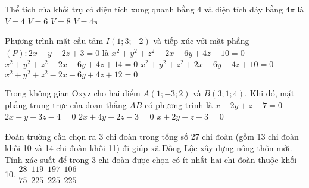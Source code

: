 \begin{ex}%
	Thể tích của khối trụ có điện tích xung quanh bằng 4 và diện tích đáy bằng $4\pi$ là
	\choice
	{\True $V=4$}
	{$V=6$}
	{$V=8$}
	{$V=4\pi$}
\end{ex}
\begin{ex}%
	Phương trình mặt cầu tâm $I\left(1;3;-2\right)$ và tiếp xúc với mặt phẳng $(P): 2x-y-2z+3=0$ là
	\choice
	{\True $x^2+y^2+z^2-2x-6y+4z+10=0$}
	{$x^2+y^2+z^2-2x-6y+4z+14=0$}
	{$x^2+y^2+z^2+2x+6y-4z+10=0$}
	{$x^2+y^2+z^2-2x-6y+4z+12=0$}
\end{ex}
\begin{ex}%
	Trong không gian Oxyz cho hai điểm $A(1;-3;2)$ và $B(3;1;4)$. Khi đó, mặt phẳng trung trực của đoạn thẳng $AB$ có phương trình là
	\choice
	{$x-2y+z-7=0$}
	{$2x-y+3z-4=0$}
	{$2x+4y+2z-3=0$}
	{\True $x+2y+z-3=0$}
\end{ex}
\begin{ex}%
	Đoàn trường cần chọn ra 3 chi đoàn trong tổng số 27 chi đoàn (gồm 13 chi đoàn khối
	10 và 14 chi đoàn khối 11) đi giúp xã Đồng Lộc xây dựng nông thôn mới. Tính xác suất để	trong 3 chi đoàn được chọn có ít nhất hai chi đoàn thuộc khối 10.
	\choice
	{$\dfrac{28}{75}$} 	
	{$\dfrac{119}{225}$}
	{$\dfrac{197}{225}$}
	{\True $\dfrac{106}{225}$}
\end{ex}
